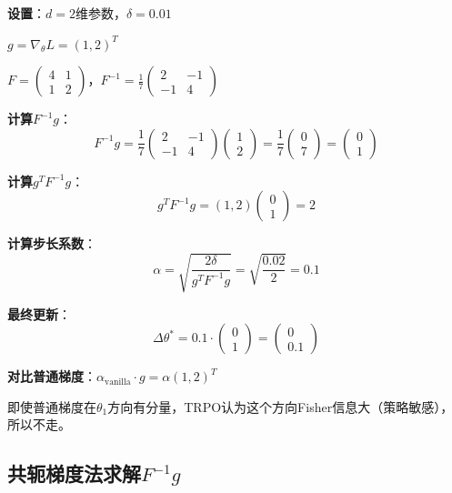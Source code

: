 \documentclass[11pt,a4paper]{article}
\theoremstyle{definition}
\begin{document}
\begin{calculation}[TRPO步长的数值例子]
\textbf{设置}：$d = 2$维参数，$\delta = 0.01$

$g = \nabla_\theta L = (1, 2)^T$

$F = \begin{pmatrix} 4 & 1 \\ 1 & 2 \end{pmatrix}$，$F^{-1} = \frac{1}{7}\begin{pmatrix} 2 & -1 \\ -1 & 4 \end{pmatrix}$

\textbf{计算$F^{-1}g$}：
\[
F^{-1}g = \frac{1}{7}\begin{pmatrix} 2 & -1 \\ -1 & 4 \end{pmatrix}\begin{pmatrix} 1 \\ 2 \end{pmatrix} = \frac{1}{7}\begin{pmatrix} 0 \\ 7 \end{pmatrix} = \begin{pmatrix} 0 \\ 1 \end{pmatrix}
\]

\textbf{计算$g^T F^{-1} g$}：
\[
g^T F^{-1} g = (1, 2) \begin{pmatrix} 0 \\ 1 \end{pmatrix} = 2
\]

\textbf{计算步长系数}：
\[
\alpha = \sqrt{\frac{2\delta}{g^T F^{-1} g}} = \sqrt{\frac{0.02}{2}} = 0.1
\]

\textbf{最终更新}：
\[
\Delta\theta^* = 0.1 \cdot \begin{pmatrix} 0 \\ 1 \end{pmatrix} = \begin{pmatrix} 0 \\ 0.1 \end{pmatrix}
\]

\textbf{对比普通梯度}：$\alpha_{\text{vanilla}} \cdot g = \alpha (1, 2)^T$

即使普通梯度在$\theta_1$方向有分量，TRPO认为这个方向Fisher信息大（策略敏感），所以不走。
\end{calculation}

\subsection{共轭梯度法求解$F^{-1}g$}
\end{document}
